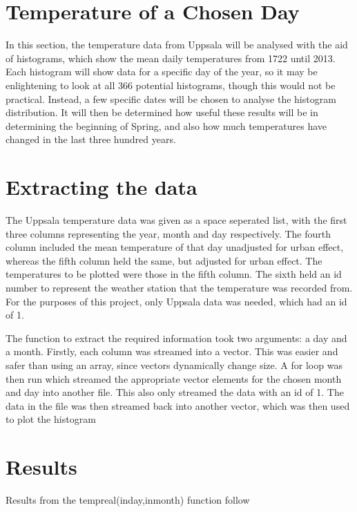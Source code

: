 \documentclass[a4paper,10pt,oneside]{article}
\author{Cameron Robertson}
\date{11/09/17}
\begin{document}
\section{Temperature of a Chosen Day}
\label{sec:intro}

 In this section, the temperature
data from Uppsala will be analysed with the aid of histograms, which show the mean daily
temperatures from 1722 until 2013. Each histogram will show data for a specific day of the year,
so it may be enlightening to look at all 366 potential histograms, though this would
not be practical. Instead, a few specific dates will be chosen to analyse the histogram
distribution. It will then be determined how useful these results will be in determining the beginning
of Spring, and also how much temperatures have changed in the last three hundred years.

\section{Extracting the data}
\label{sec:data}

The Uppsala temperature data was given as a space seperated list, with the first three
columns representing the year, month and day respectively. The fourth column included the mean
temperature of that day unadjusted for urban effect, whereas the fifth column held
the same, but adjusted for urban effect. The temperatures to be plotted were those 
in the fifth column. The sixth held an id number to represent the weather station
that the temperature was recorded from. For the purposes of this project, only Uppsala
data was needed, which had an id of 1.

The function to extract the required information took two arguments: a day and a month. Firstly, each column was streamed into a vector. This was
easier and safer than using an array, since vectors dynamically change size. A for loop was then run which streamed the appropriate vector elements for the
chosen month and day into another file. This also only streamed the data with an id of 1. The data in the file was then streamed back into another
vector, which was then used to plot the histogram

\section{Results}
\label{sec:res}

Results from the tempreal(inday,inmonth) function follow
\end{document}
